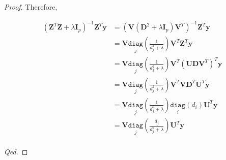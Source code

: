 \documentclass{article}
\begin{document}
\begin{proof}
\vspace{-1em} \hspace{1.3em}
Therefore, 

\vspace{-2.5em}
\begin{align*}
    \left(\boldsymbol{Z}^T\boldsymbol{Z}+\lambda \boldsymbol{I}_p\right)^{-1}\boldsymbol{Z}^T\boldsymbol{y} 
    &= \left(\boldsymbol{V}\left(\boldsymbol{D}^2 +\lambda \boldsymbol{I}_p\right)\boldsymbol{V}^T\right)^{-1}\boldsymbol{Z}^T\boldsymbol{y} \\
    &= \boldsymbol{V}\underset{j}{\mathtt{diag}}\left(\frac{1}{d_j^2+\lambda}\right)\boldsymbol{V}^T\boldsymbol{Z}^T\boldsymbol{y} \\
    &= \boldsymbol{V}\underset{j}{\mathtt{diag}}\left(\frac{1}{d_j^2+\lambda}\right)\boldsymbol{V}^T\left(\boldsymbol{UD}\boldsymbol{V}^T\right)^T\boldsymbol{y} \\
    &= \boldsymbol{V}\underset{j}{\mathtt{diag}}\left(\frac{1}{d_j^2+\lambda}\right)\boldsymbol{V}^T\boldsymbol{V}\boldsymbol{D}^T\boldsymbol{U}^T\boldsymbol{y} \\
    &= \boldsymbol{V}\underset{j}{\mathtt{diag}}\left(\frac{1}{d_j^2+\lambda}\right)\underset{i}{\mathtt{diag}}\left(d_i\right)\boldsymbol{U}^T\boldsymbol{y} \\
    &= \boldsymbol{V}\underset{j}{\mathtt{diag}}\left(\frac{d_j}{d_j^2+\lambda}\right)\boldsymbol{U}^T\boldsymbol{y} \\
\end{align*}

\vspace{-3em} \hspace{38em}
\textit{Qed.}
\end{proof}
\end{document}
